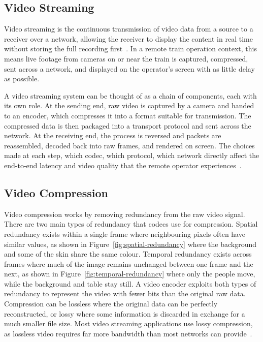 \vspace{5mm}
\subsection{Video Streaming}\label{subsec:video-streaming}
Video streaming is the continuous transmission of video data from a source to a receiver over a network, allowing the receiver to display the content in real time without storing the full recording first~\cite{sodagar2011}. In a remote train operation context, this means live footage from cameras on or near the train is captured, compressed, sent across a network, and displayed on the operator's screen with as little delay as possible.
 
A video streaming system can be thought of as a chain of components, each with its own role. At the sending end, raw video is captured by a camera and handed to an encoder, which compresses it into a format suitable for transmission. The compressed data is then packaged into a transport protocol and sent across the network. At the receiving end, the process is reversed and packets are reassembled, decoded back into raw frames, and rendered on screen. The choices made at each step, which codec, which protocol, which network directly affect the end-to-end latency and video quality that the remote operator experiences~\cite{myhrvold2025, mejias2024}.

\vspace{5mm}
\subsection{Video Compression}\label{subsec:codecs}
Video compression works by removing redundancy from the raw video signal. There are two main types of redundancy that codecs use for compression. Spatial redundancy exists within a single frame where neighbouring pixels often have similar values, as shown in Figure~\ref{fig:spatial-redundancy} where the background and some of the skin share the same colour. Temporal redundancy exists across frames where much of the image remains unchanged between one frame and the next, as shown in Figure~\ref{fig:temporal-redundancy} where only the people move, while the background and table stay still. A video encoder exploits both types of redundancy to represent the video with fewer bits than the original raw data. Compression can be lossless where the original data can be perfectly reconstructed, or lossy where some information is discarded in exchange for a much smaller file size. Most video streaming applications use lossy compression, as lossless video requires far more bandwidth than most networks can provide~\cite{blomqvist2018, richardson2010}.


